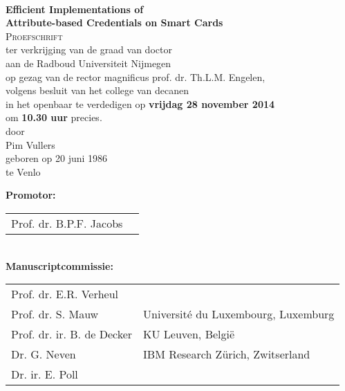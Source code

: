 \thispagestyle{empty}

\begin{center}
  ~ \\[25mm]

  \textbf{\Large Efficient Implementations of\\ Attribute-based Credentials on Smart Cards}\\[20mm]

  \textsc{Proefschrift} \\[15mm]

  ter verkrijging van de graad van doctor \\
  aan de Radboud Universiteit Nijmegen \\
  op gezag van de rector magnificus prof. dr. Th.L.M. Engelen, \\
  volgens besluit van het college van decanen \\
  in het openbaar te verdedigen op \textbf{vrijdag 28 november 2014} \\
  om \textbf{10.30 uur} precies. \\[20mm]

  door \\[20mm]

  Pim Vullers \\[15mm]

  geboren op 20 juni 1986 \\
  te Venlo
\end{center}

\clearpage

\thispagestyle{empty}

\noindent\textbf{Promotor:} \\[2mm]
\indent\begin{tabular}{p{40	mm}l}
  Prof. dr. B.P.F. Jacobs & \\
\end{tabular} \\[2mm]

\noindent\textbf{Manuscriptcommissie:} \\[2mm]
\indent\begin{tabular}{p{40mm}l}
  Prof. dr. E.R. Verheul     & \\
  Prof. dr. S. Mauw          & Universit\'{e} du Luxembourg, Luxemburg \\
  Prof. dr. ir. B. de Decker & KU Leuven, Belgi\"{e} \\
  Dr. G. Neven               & IBM Research Z\"{u}rich, Zwitserland \\
  Dr. ir. E. Poll            & \\
\end{tabular}
